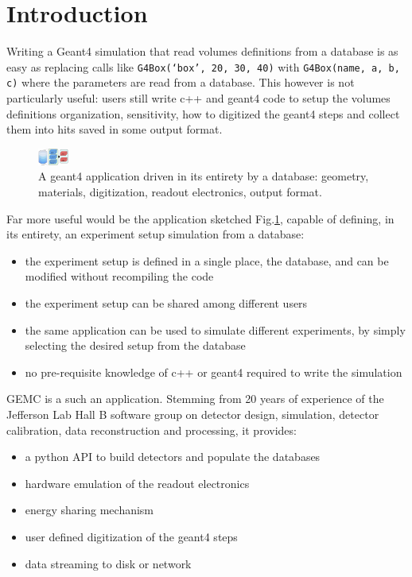 \section{Introduction}
\label{sec:intro}

Writing a Geant4\cite{geant4} simulation that read volumes definitions from a database is
as easy as replacing calls like \verb|G4Box(‘box’, 20, 30, 40)| with
\verb|G4Box(name, a, b, c)| where the parameters are read from a database.
This however is not particularly useful: users still write c++ and geant4 code to setup
the volumes definitions organization, sensitivity, how to digitized the geant4 steps
and collect them into hits saved in some output format.

\begin{figure}[h]

    \centering
    \includegraphics[width=1cm,clip]{img/db}
    \caption{A geant4 application driven in its entirety by a database: geometry, materials,
        digitization, readout electronics, output format.}
    \label{fig:db}
\end{figure}

Far more useful would be the application sketched Fig.\ref{fig:db}, capable of defining, in its entirety, an
experiment setup simulation from a database:


\begin{itemize}
    \item the experiment setup is defined in a single place, the database, and can be
    modified without recompiling the code
    \item the experiment setup can be shared among different users
    \item the same application can be used to simulate different experiments, by simply
    selecting the desired setup from the database
    \item no pre-requisite knowledge of c++ or geant4 required to write the simulation
\end{itemize}

GEMC\cite{clas12_gemc} is a such an application.
Stemming from 20 years of experience of the Jefferson Lab Hall B software group
on detector design, simulation, detector calibration, data reconstruction and processing,
it provides:

\begin{itemize}
    \item a python API to build detectors and populate the databases
    \item hardware emulation of the readout electronics
    \item energy sharing mechanism
    \item user defined digitization of the geant4 steps
    \item data streaming to disk or network
\end{itemize}


